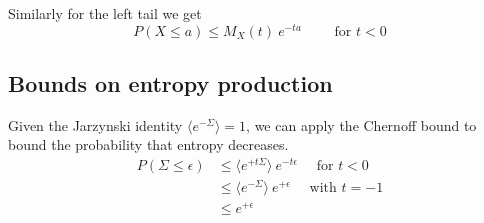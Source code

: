 \documentclass[Lectures.tex]{subfiles}
\begin{document}
Similarly for the left tail we get 
\[
 P \left(X \leq a \right) \leq M_X(t)\ e^{-t a} \qquad \text{ for } t < 0
\]


\subsection{Bounds on entropy production}
Given the Jarzynski identity $\langle e^{-\Sigma}\rangle=1$, we can apply the Chernoff bound to bound the probability that entropy decreases. 
\begin{subequations}
\begin{align}
 P\left(\Sigma \leq \epsilon \right) &\leq \langle e^{+t\Sigma}\rangle\ e^{- t \epsilon} \quad \text{ for } t < 0 \\
 & \leq \langle e^{-\Sigma}\rangle\ e^{+ \epsilon} \quad \text{ with } t = -1 \\
 & \leq  e^{+ \epsilon}
\end{align}
\end{subequations}
\end{document}
